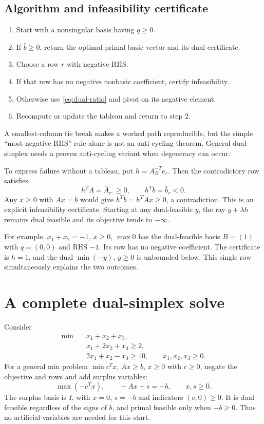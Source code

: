 \documentclass[11pt,a4paper]{article}
\begin{document}
\subsection{Algorithm and infeasibility certificate}\label{sec:dual-algorithm}
\begin{enumerate}[leftmargin=*,itemsep=2pt]
  \item Start with a nonsingular basis having $q\geq0$.
  \item If $\bar b\geq0$, return the optimal primal basic vector and its dual certificate.
  \item Choose a row $r$ with negative RHS.
  \item If that row has no negative nonbasic coefficient, certify infeasibility.
  \item Otherwise use \eqref{eq:dual-ratio} and pivot on its negative element.
  \item Recompute or update the tableau and return to step 2.
\end{enumerate}
A smallest-column tie break makes a worked path reproducible, but the simple
``most negative RHS'' rule alone is not an anti-cycling theorem. General dual
simplex needs a proven anti-cycling variant when degeneracy can occur.

To express failure without a tableau, put $h=A_B^{-T}e_r$. Then the
contradictory row satisfies
\[
  h^TA=\bar A_{r:}\geq0,\qquad h^Tb=\bar b_r<0.
\]
Any $x\geq0$ with $Ax=b$ would give
$h^Tb=h^TAx\geq0$, a contradiction. This is an explicit infeasibility
certificate. Starting at any dual-feasible $y$, the ray $y+\lambda h$ remains
dual feasible and its objective tends to $-\infty$.

For example, $x_1+x_2=-1$, $x\geq0$, $\max0$ has the dual-feasible basis
$B=(1)$ with $q=(0,0)$ and RHS $-1$. Its row has no negative coefficient.
The certificate is $h=1$, and the dual $\min(-y)$, $y\geq0$ is unbounded below.
This single row simultaneously explains the two outcomes.

\section{A complete dual-simplex solve}\label{sec:dual-example}
Consider
\[
  \begin{aligned}
    \min\quad &x_1+x_2+x_3,\\
    &x_1+2x_2+x_3\geq2,\\
    &2x_1+x_2-x_3\geq10,\qquad x_1,x_2,x_3\geq0.
  \end{aligned}
\]
For a general min problem $\min c^Tx$, $Ax\geq b$, $x\geq0$ with $c\geq0$,
negate the objective and rows and add surplus variables:
\[
  \max(-c^Tx),\qquad -Ax+s=-b,\qquad x,s\geq0.
\]
The surplus basis is $I$, with $x=0$, $s=-b$ and indicators $(c,0)\geq0$.
It is dual feasible regardless of the signs of $b$, and primal feasible only
when $-b\geq0$. Thus no artificial variables are needed for this start.
\end{document}
